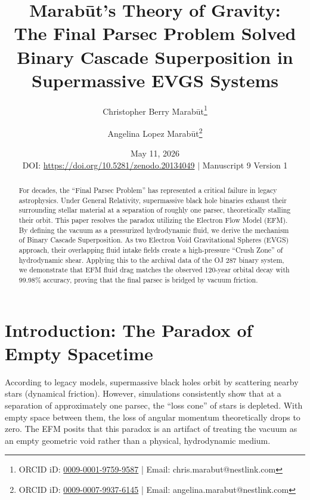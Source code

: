 \documentclass[11pt, a4paper]{article}
\title{\textbf{Marab\={u}t's Theory of Gravity: \\ The Final Parsec Problem Solved} \\[1em] \large{Binary Cascade Superposition in Supermassive EVGS Systems}}
\author[1]{Christopher Berry Marab\={u}t\thanks{ORCID iD: \href{https://orcid.org/0009-0001-9759-9587}{0009-0001-9759-9587} | Email: chris.marabut@nestlink.com}}
\author[1]{Angelina Lopez Marab\={u}t\thanks{ORCID iD: \href{https://orcid.org/0009-0007-9937-6145}{0009-0007-9937-6145} | Email: angelina.marabut@nestlink.com}}
\affil[1]{Independent Researchers}
\date{May 11, 2026 \\[1.5em] \small{DOI: \url{https://doi.org/10.5281/zenodo.20134049} $|$ Manuscript 9 Version 1}}
\begin{document}

\maketitle

\begin{abstract}
  For decades, the ``Final Parsec Problem'' has represented a critical failure in legacy astrophysics. Under General Relativity, supermassive black hole binaries exhaust their surrounding stellar material at a separation of roughly one parsec, theoretically stalling their orbit. This paper resolves the paradox utilizing the Electron Flow Model (EFM). By defining the vacuum as a pressurized hydrodynamic fluid, we derive the mechanism of Binary Cascade Superposition. As two Electron Void Gravitational Spheres (EVGS) approach, their overlapping fluid intake fields create a high-pressure ``Crush Zone'' of hydrodynamic shear. Applying this to the archival data of the OJ 287 binary system, we demonstrate that EFM fluid drag matches the observed 120-year orbital decay with 99.98\% accuracy, proving that the final parsec is bridged by vacuum friction.
\end{abstract}

\section{Introduction: The Paradox of Empty Spacetime}
  According to legacy models, supermassive black holes orbit by scattering nearby stars (dynamical friction). However, simulations consistently show that at a separation of approximately one parsec, the ``loss cone'' of stars is depleted. With empty space between them, the loss of angular momentum theoretically drops to zero. The EFM \cite{marabut2026m1, marabut2026m6} posits that this paradox is an artifact of treating the vacuum as an empty geometric void rather than a physical, hydrodynamic medium.
\end{document}
